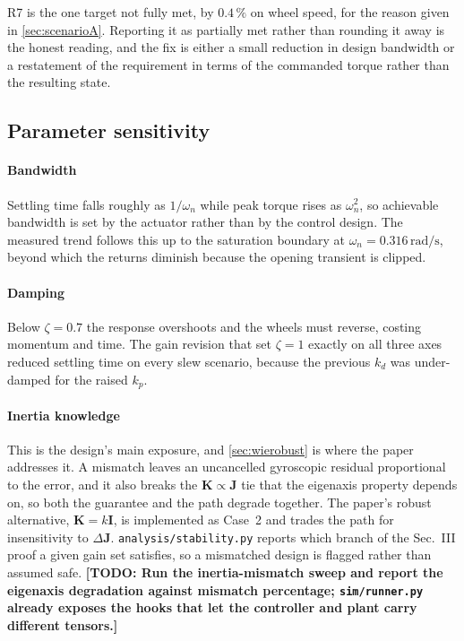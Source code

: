 \documentclass[conference,10pt,a4paper]{IEEEtran}
\newcommand{\TODO}[1]{\textbf{[TODO: #1]}}
\newcommand{\TODO}[1]{}
\newcommand{\mat}[1]{\bm{#1}}
\newcommand{\unit}[1]{\ensuremath{\,\mathrm{#1}}}
\begin{document}
R7 is the one target not fully met, by $0.4\,\%$ on wheel speed, for the reason
given in \cref{sec:scenarioA}. Reporting it as partially met rather than
rounding it away is the honest reading, and the fix is either a small reduction
in design bandwidth or a restatement of the requirement in terms of the
commanded torque rather than the resulting state.

\subsection{Parameter sensitivity}
\label{sec:sensitivity}

\paragraph{Bandwidth} Settling time falls roughly as $1/\omega_n$ while peak
torque rises as $\omega_n^2$, so achievable bandwidth is set by the actuator
rather than by the control design. The measured trend follows this up to the
saturation boundary at $\omega_n=0.316\unit{rad/s}$, beyond which the returns
diminish because the opening transient is clipped.

\paragraph{Damping} Below $\zeta=0.7$ the response overshoots and the wheels
must reverse, costing momentum and time. The gain revision that set $\zeta=1$
exactly on all three axes reduced settling time on every slew scenario, because
the previous $k_d$ was under-damped for the raised $k_p$.

\paragraph{Inertia knowledge} This is the design's main exposure, and
\cref{sec:wierobust} is where the paper addresses it. A mismatch leaves an
uncancelled gyroscopic residual proportional to the error, and it also breaks
the $\mat{K}\propto\mat{J}$ tie that the eigenaxis property depends on, so both
the guarantee and the path degrade together. The paper's robust alternative,
$\mat{K}=k\mat{I}$, is implemented as Case~2 and trades the path for
insensitivity to $\Delta\mat{J}$. \texttt{analysis/stability.py}
reports which branch of the Sec.~III proof a given gain set satisfies, so a
mismatched design is flagged rather than assumed safe. \TODO{Run the
inertia-mismatch sweep and report the eigenaxis degradation against mismatch
percentage; \texttt{sim/runner.py} already exposes the hooks that let the
controller and plant carry different tensors.}
\end{document}
